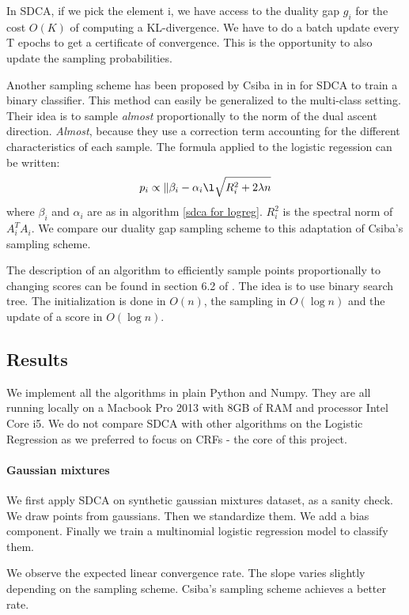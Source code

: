 \documentclass{article}
\DeclareMathOperator{\1}{\mathbb{1}}
\begin{document}
In SDCA, if we pick the element i, we have access to the duality gap $g_i$ for the cost $O(K)$ of computing a KL-divergence.
We have to do a batch update every T epochs to get a certificate of convergence.
This is the opportunity to also update the sampling probabilities.

Another sampling scheme has been proposed by Csiba in  in \cite{csiba_stochastic_2015} for SDCA to train a binary classifier.
This method can easily be generalized to the multi-class setting.
Their idea is to sample \textit{almost} proportionally to the norm of the dual ascent direction.
\textit{Almost}, because they use a correction term accounting for the different characteristics of each sample.
The formula applied to the logistic regession can be written:
\begin{equation}
	\label{csiba}
	p_i \propto \| \beta_i - \alpha_i \l \sqrt{R_i^2 + 2 \lambda n} 
\end{equation}
where $\beta_i$ and $\alpha_i$ are as in algorithm \ref{sdca for logreg}. 
$R_i^2$ is the spectral norm of $A_i^TA_i$.
We compare our duality gap sampling scheme to this adaptation of Csiba's sampling scheme.

The description of an algorithm to efficiently sample points proportionally to changing scores can be found in section 6.2 of \cite{nesterov_efficiency_2012}.
The idea is to use binary search tree.
The initialization is done in $O(n)$, the sampling in $O(\log n)$ and the update of a score in $O(\log n)$.

\subsection{Results}

We implement all the algorithms in plain Python and Numpy.
They are all running locally on a Macbook Pro 2013 with 8GB of RAM and processor Intel Core i5.
We do not compare SDCA with other algorithms on the Logistic Regression as we preferred to focus on CRFs - the core of this project.

\paragraph{Gaussian mixtures}
We first apply SDCA on synthetic gaussian mixtures dataset, as a sanity check.
We draw points from gaussians.
Then we standardize them.
We add a bias component.
Finally we train a multinomial logistic regression model to classify them.

We observe the expected linear convergence rate.
The slope varies slightly depending on the sampling scheme.
Csiba's sampling scheme achieves a better rate.
\end{document}
